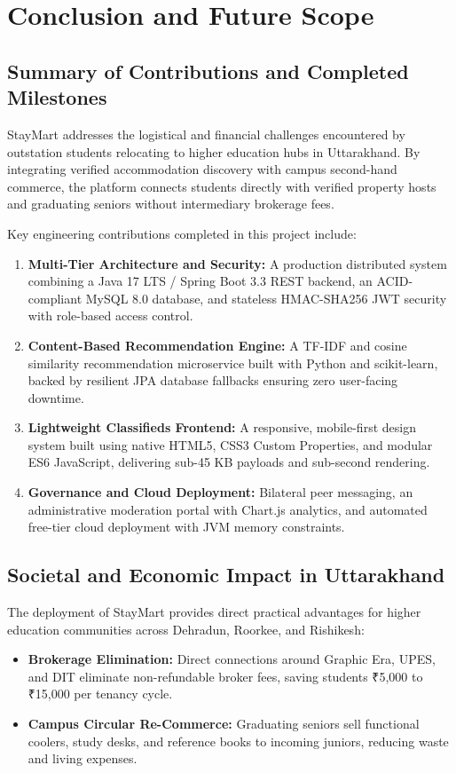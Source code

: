 \chapter{Conclusion and Future Scope}

\section{Summary of Contributions and Completed Milestones}
StayMart addresses the logistical and financial challenges encountered by outstation students relocating to higher education hubs in Uttarakhand. By integrating verified accommodation discovery with campus second-hand commerce, the platform connects students directly with verified property hosts and graduating seniors without intermediary brokerage fees.

Key engineering contributions completed in this project include:
\begin{enumerate}
    \item \textbf{Multi-Tier Architecture and Security:} A production distributed system combining a Java 17 LTS / Spring Boot 3.3 REST backend, an ACID-compliant MySQL 8.0 database, and stateless HMAC-SHA256 JWT security with role-based access control.
    \item \textbf{Content-Based Recommendation Engine:} A TF-IDF and cosine similarity recommendation microservice built with Python and scikit-learn, backed by resilient JPA database fallbacks ensuring zero user-facing downtime.
    \item \textbf{Lightweight Classifieds Frontend:} A responsive, mobile-first design system built using native HTML5, CSS3 Custom Properties, and modular ES6 JavaScript, delivering sub-45 KB payloads and sub-second rendering.
    \item \textbf{Governance and Cloud Deployment:} Bilateral peer messaging, an administrative moderation portal with Chart.js analytics, and automated free-tier cloud deployment with JVM memory constraints.
\end{enumerate}

\section{Societal and Economic Impact in Uttarakhand}
The deployment of StayMart provides direct practical advantages for higher education communities across Dehradun, Roorkee, and Rishikesh:
\begin{itemize}
    \item \textbf{Brokerage Elimination:} Direct connections around Graphic Era, UPES, and DIT eliminate non-refundable broker fees, saving students ₹5,000 to ₹15,000 per tenancy cycle.
    \item \textbf{Campus Circular Re-Commerce:} Graduating seniors sell functional coolers, study desks, and reference books to incoming juniors, reducing waste and living expenses.
\end{itemize}

